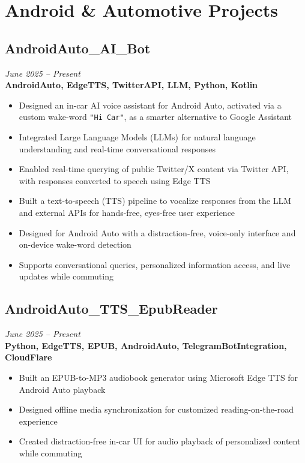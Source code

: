 \documentclass[11pt,a4paper]{article}
\begin{document}
\section*{Android \& Automotive Projects}
\subsection{AndroidAuto\_AI\_Bot}
\textit{June 2025 -- Present} \\
\textbf{AndroidAuto, EdgeTTS, TwitterAPI, LLM, Python, Kotlin}
\begin{itemize}
\item Designed an in-car AI voice assistant for Android Auto, activated via a custom wake-word \texttt{"Hi Car"}, as a smarter alternative to Google Assistant
\item Integrated Large Language Models (LLMs) for natural language understanding and real-time conversational responses
\item Enabled real-time querying of public Twitter/X content via Twitter API, with responses converted to speech using Edge TTS
\item Built a text-to-speech (TTS) pipeline to vocalize responses from the LLM and external APIs for hands-free, eyes-free user experience
\item Designed for Android Auto with a distraction-free, voice-only interface and on-device wake-word detection
\item Supports conversational queries, personalized information access, and live updates while commuting
\end{itemize}

\subsection{AndroidAuto\_TTS\_EpubReader}
\textit{June 2025 -- Present} \\
\textbf{Python, EdgeTTS, EPUB, AndroidAuto, TelegramBotIntegration, CloudFlare}
\begin{itemize}
\item Built an EPUB-to-MP3 audiobook generator using Microsoft Edge TTS for Android Auto playback
\item Designed offline media synchronization for customized reading-on-the-road experience
\item Created distraction-free in-car UI for audio playback of personalized content while commuting
\end{itemize}
\end{document}
